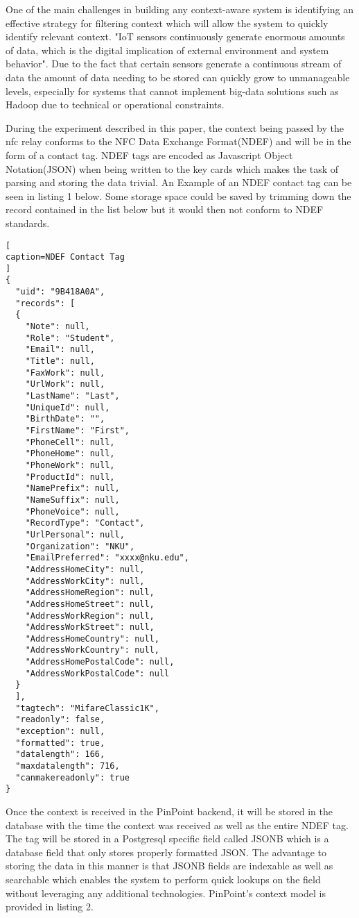 \documentclass[11pt,journal]{IEEEtran}
\begin{document}
One of the main challenges in building any context-aware system is identifying an effective strategy for filtering context which will allow the system to quickly identify relevant context.  "IoT sensors continuously generate enormous amounts of data, which is the digital implication of external environment and system behavior".\cite{Song:2018:TIC:3180374.3181341}  Due to the fact that certain sensors generate a continuous stream of data the amount of data needing to be stored can quickly grow to unmanageable levels, especially for systems that cannot implement big-data solutions such as Hadoop due to technical or operational constraints.

During the experiment described in this paper, the context being passed by the nfc relay conforms to the NFC Data Exchange Format(NDEF) and will be in the form of a contact tag. NDEF tags are encoded as Javascript Object Notation(JSON) when being written to the key cards which makes the task of parsing and storing the data trivial. An Example of an NDEF contact tag can be seen in listing 1 below.  Some storage space could be saved by trimming down the record contained in the list below but it would then not conform to NDEF standards.

\begin{lstlisting}[
caption=NDEF Contact Tag
]
{
  "uid": "9B418A0A",
  "records": [
  {
    "Note": null,
	"Role": "Student",
	"Email": null,
	"Title": null,
	"FaxWork": null,
	"UrlWork": null,
	"LastName": "Last",
	"UniqueId": null,
	"BirthDate": "",
	"FirstName": "First",
	"PhoneCell": null,
	"PhoneHome": null,
	"PhoneWork": null,
	"ProductId": null,
	"NamePrefix": null,
	"NameSuffix": null,
	"PhoneVoice": null,
	"RecordType": "Contact",
	"UrlPersonal": null,
	"Organization": "NKU",
	"EmailPreferred": "xxxx@nku.edu",
	"AddressHomeCity": null,
	"AddressWorkCity": null,
	"AddressHomeRegion": null,
	"AddressHomeStreet": null,
	"AddressWorkRegion": null,
	"AddressWorkStreet": null,
	"AddressHomeCountry": null,
	"AddressWorkCountry": null,
	"AddressHomePostalCode": null,
	"AddressWorkPostalCode": null
  }
  ],
  "tagtech": "MifareClassic1K",
  "readonly": false,
  "exception": null,
  "formatted": true,
  "datalength": 166,
  "maxdatalength": 716,
  "canmakereadonly": true
}
\end{lstlisting}

Once the context is received in the PinPoint backend, it will be stored in the database with the time the context was received as well as the entire NDEF tag.  The tag will be stored in a Postgresql specific field called JSONB which is a database field that only stores properly formatted JSON.  The advantage to storing the data in this manner is that JSONB fields are indexable as well as searchable which enables the system to perform quick lookups on the field without leveraging any additional technologies. PinPoint's context model is provided in listing 2.
\end{document}
